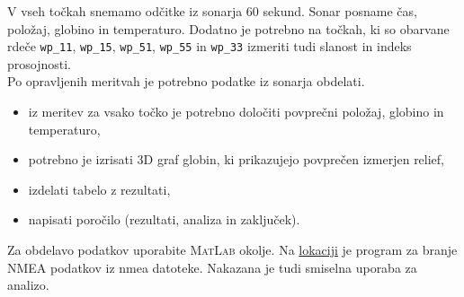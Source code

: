 \noindent
V vseh točkah snemamo odčitke iz sonarja 60 sekund. Sonar posname čas, položaj, globino in temperaturo. Dodatno je potrebno na točkah, ki so obarvane rdeče \texttt{wp\_11}, \texttt{wp\_15}, \texttt{wp\_51}, \texttt{wp\_55} in \texttt{wp\_33} izmeriti tudi slanost in indeks prosojnosti.\\[5mm]

\noindent
Po opravljenih meritvah je potrebno podatke iz sonarja obdelati.
\begin{itemize}
	\item iz meritev za vsako točko je potrebno določiti povprečni položaj, globino in temperaturo,
	\item potrebno je izrisati 3D graf globin, ki prikazujejo povprečen izmerjen relief,
	\item izdelati tabelo z rezultati,
	\item napisati poročilo (rezultati, analiza in zaključek).
\end{itemize}

\noindent
Za obdelavo podatkov uporabite \textsc{MatLab} okolje. Na \href{https://drive.google.com/open?id=0B1dT-CBA07ANSXl2YmIxcXdUQkk}{lokaciji} je program za branje NMEA podatkov iz nmea datoteke. Nakazana je tudi smiselna uporaba za analizo.

